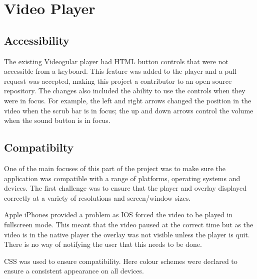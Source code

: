 \chapter{Video Player} 
\label{Chapter:Video Player}
\section{Accessibility} 
\label{Section:Accessibility}
The existing Videogular player had HTML button controls that were not accessible from a keyboard. This feature was added to the player and a pull request was accepted, making this project a contributor to an open source repository. The changes also included the ability to use the controls when they were in focus. For example, the left and right arrows changed the position in the video when the scrub bar is in focus; the up and down arrows control the volume when the sound button is in focus.
\section{Compatibilty} 
\label{Section:Compatibility}
One of the main focuses of this part of the project was to make sure the application was compatible with a range of platforms, operating systems and devices. The first challenge was to ensure that the player and overlay displayed correctly at a variety of resolutions and screen/window sizes. 

Apple iPhones provided a problem as IOS forced the video to be played in fullscreen mode. This meant that the video paused at the correct time but as the video is in the native player the overlay was not visible unless the player is quit. There is no way of notifying the user that this needs to be done.

CSS was used to ensure compatibility. Here colour schemes were declared to ensure a consistent appearance on all devices.